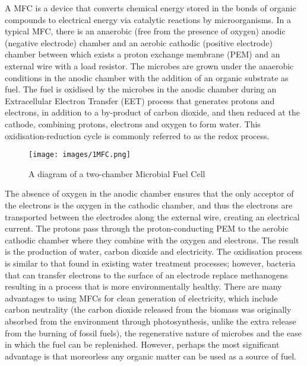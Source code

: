 \documentclass[12pt]{article}
\begin{document}
A MFC is a device that converts chemical energy stored in the bonds of organic compounds to electrical energy via catalytic reactions by microorganisms. In a typical MFC, there is an anaerobic (free from the presence of oxygen) anodic (negative electrode) chamber and an aerobic cathodic (positive electrode) chamber between which exists a proton exchange membrane (PEM) and an external wire with a load resistor. The microbes are grown under the anaerobic conditions in the anodic chamber with the addition of an organic substrate as fuel.  The fuel is oxidised by the microbes in the anodic chamber during an Extracellular Electron Transfer (EET) process that generates protons and electrons, in addition to a by-product of carbon dioxide, and then reduced at the cathode, combining protons, electrons and oxygen to form water. This oxidisation-reduction cycle is commonly referred to as the redox process.\cite{du2007state}\cite{logan2006microbial}

\begin{figure}[ht]
\centering
\texttt{[image: images/1MFC.png]}
\caption{A diagram of a two-chamber Microbial Fuel Cell \cite{du2007state}}%
\end{figure}

The absence of oxygen in the anodic chamber ensures that the only acceptor of the electrons is the oxygen in the cathodic chamber, and thus the electrons are transported between the electrodes along the external wire, creating an electrical current. The protons pass through the proton-conducting PEM to the aerobic cathodic chamber where they combine with the oxygen and electrons. The result is the production of water, carbon dioxide and electricity. The oxidisation process is similar to that found in existing water treatment processes; however, bacteria that can transfer electrons to the surface of an electrode replace methanogens resulting in a process that is more environmentally healthy.\cite{ghangrekar2006microbial} There are many advantages to using MFCs for clean generation of electricity, which include carbon neutrality (the carbon dioxide released from the biomass was originally absorbed from the environment through photosynthesis, unlike the extra release from the burning of fossil fuels), the regenerative nature of microbes and the ease in which the fuel can be replenished. However, perhaps the most significant advantage is that moreorless any organic matter can be used as a source of fuel.\cite{liu2004production}
\end{document}

